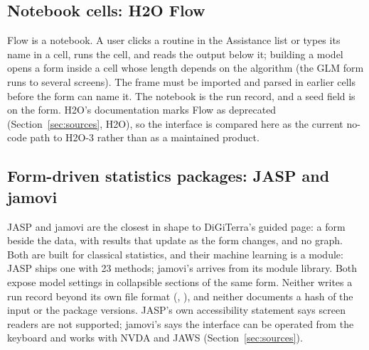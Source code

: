 \subsection{Notebook cells: H2O Flow}



Flow is a notebook. A user clicks a routine in the Assistance list or types its name in a cell, runs the cell, and reads the output below it; building a model opens a form inside a cell whose length depends on the algorithm (the GLM form runs to several screens). The frame must be imported and parsed in earlier cells before the form can name it. The notebook is the run record, and a seed field is on the form. H2O's documentation marks Flow as deprecated (Section~\ref{sec:sources}, H2O), so the interface is compared here as the current no-code path to H2O-3 rather than as a maintained product.

\subsection{Form-driven statistics packages: JASP and jamovi}



JASP and jamovi are the closest in shape to DiGiTerra's guided page: a form beside the data, with results that update as the form changes, and no graph. Both are built for classical statistics, and their machine learning is a module: JASP ships one with 23 methods; jamovi's arrives from its module library. Both expose model settings in collapsible sections of the same form. Neither writes a run record beyond its own file format (, ), and neither documents a hash of the input or the package versions. JASP's own accessibility statement says screen readers are not supported; jamovi's says the interface can be operated from the keyboard and works with NVDA and JAWS (Section~\ref{sec:sources}).

